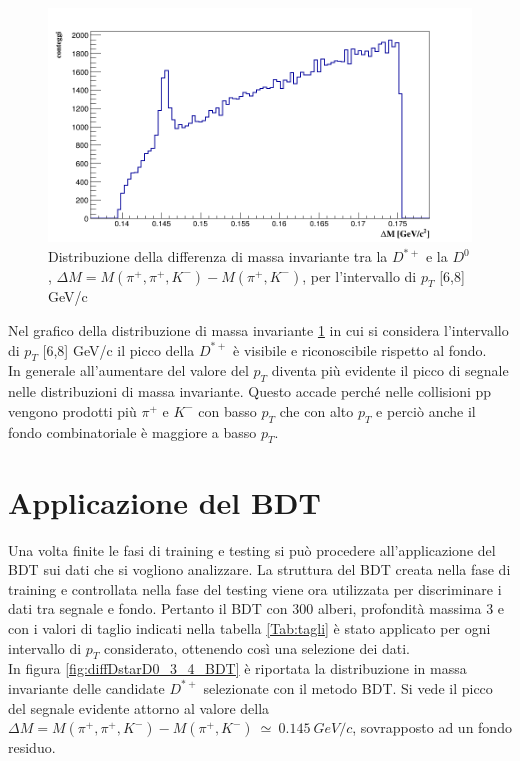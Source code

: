     \begin{figure}[htbp]
        \centering
        \includegraphics[width=0.7\linewidth]{AnalisiDati/dati_6_8.png}
        \caption{Distribuzione della differenza di massa invariante tra la $D^{*+}$ e la $D^0$, $\Delta M = M(\pi^+,\pi^+,K^-) - M(\pi^+,K^-)$, per l'intervallo di $p_T$ [6,8] GeV/c}
        \label{fig:grafmassDstar2}
    \end{figure}

Nel grafico della distribuzione di massa invariante \ref{fig:grafmassDstar2} in cui si considera l'intervallo di $p_T$ [6,8] GeV/c il picco della $D^{*+}$ è visibile e riconoscibile rispetto al fondo. 
\\In generale all'aumentare del valore del $p_T$ diventa più evidente il picco di segnale nelle distribuzioni di massa invariante. Questo accade perché nelle collisioni pp vengono prodotti più $\pi^+$ e $K^-$ con basso $p_T$ che con alto $p_T$ e perciò anche il fondo combinatoriale è maggiore a basso $p_T$.


\section{Applicazione del BDT}
Una volta finite le fasi di training e testing si può procedere all'applicazione del BDT sui dati che si vogliono analizzare. La struttura del BDT creata nella fase di training e  controllata nella fase del testing viene ora utilizzata per discriminare i dati tra segnale e fondo. Pertanto il BDT con 300 alberi, profondità massima 3 e con i valori di taglio indicati nella tabella \ref{Tab:tagli} è stato applicato per ogni intervallo di $p_T$ considerato, ottenendo così una selezione dei dati.
\\In figura \ref{fig:diffDstarD0_3_4_BDT} è riportata la distribuzione in massa invariante delle candidate $D^{*+}$ selezionate con il metodo BDT. Si vede il picco del segnale evidente attorno al valore della $ \Delta M = M(\pi^+,\pi^+,K^-) - M(\pi^+,K^-) \ \simeq \ 0.145 \ GeV/c$, sovrapposto ad un fondo residuo.


